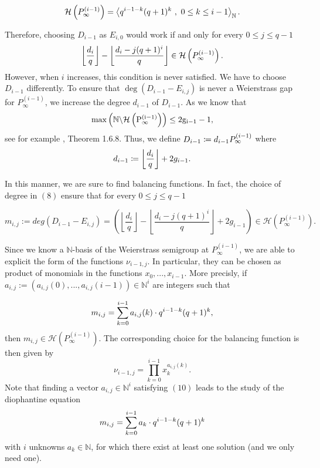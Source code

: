 \documentclass[10pt]{article}
\begin{document}
\[\mathcal{H}\left(P^{(i-1)}_{\infty}\right) = \left \langle q^{i-1-k}(q+1)^k \ , \ 0\leq k \leq i-1 \right\rangle_{\mathbb{N}}.\]

Therefore, choosing $D_{i-1}$ as $E_{i,0}$ would work if and only for every $0 \leq j \leq q-1$
\[ \left\lfloor \dfrac{d_i}{q} \right\rfloor - \left\lfloor \dfrac{d_i-j(q+1)^i}{q}\right\rfloor \in \mathcal{H}\left(P^{(i-1)}_{\infty}\right).\]
However, when $i$ increases, this condition is never satisfied. We have to choose $D_{i-1}$ differently.  To ensure that 
$\deg(D_{i-1}-E_{i,j})$ is never a Weierstrass gap for $P_{\infty}^{(i-1)}$, we increase the degree $d_{i-1}$ of $D_{i-1}$. As we know that
\[\rm{max}\left(\mathbb{N} \backslash \mathcal{H}\left(P^{(i-1)}_{\infty}\right)\right) \leq 2g_{i-1} -1,\]
see for example \cite{S08}, Theorem 1.6.8.
Thus, we define $D_{i-1}\coloneqq d_{i-1} P^{(i-1)}_{\infty}$ where
\begin{equation}\label{eq:deg_herm}
d_{i-1} \coloneqq \left\lfloor \dfrac{d_i}{q}\right\rfloor + 2g_{i-1}.
\end{equation}


In this manner, we are sure to find balancing functions. In fact, the choice of degree in $(8)$ ensure that for every $0 \leq j \leq q-1$ 

\begin{equation}
m_{i,j}:=deg(D_{i-1}-E_{i,j}) =  \left(\left\lfloor \dfrac{d_i}{q} \right\rfloor - \left\lfloor \dfrac{d_i-j(q+1)^i}{q}\right\rfloor + 2g_{i-1} \right) \in \mathcal{H}\left(P_{\infty}^{(i-1)}\right).
\end{equation}

Since we know a $\mathbb{N}$-basis of the Weierstrass semigroup at $P_{\infty}^{(i-1)}$, we are able to explicit the form of the functions $\nu_{i-1,j}$. In particular, they can be chosen as product of monomials in the functions $x_0,...,x_{i-1}$. More precisly, if $a_{i,j} := (a_{i,j}(0),...,a_{i,j}(i-1)) \in \mathbb{N}^i$ are integers such that

\begin{equation}
m_{i,j} = \sum\limits_{k=0}^{i-1} a_{i,j}(k) \cdot q^{i-1-k}(q+1)^k,
\end{equation}
then $m_{i,j} \in \mathcal{H}\left(P_{\infty}^{(i-1)}\right)$. The corresponding choice for the balancing function is then given by 
\[ \nu_{i-1,j} = \prod\limits_{k=0}^{i-1} x_k^{a_{i,j}(k)}.\]
Note that finding a vector $a_{i,j} \in \mathbb{N}^i$ satisfying $(10)$ leads to the study of the diophantine equation
\[m_{i,j} = \sum\limits_{k=0}^{i-1} a_k \cdot q^{i-1-k}(q+1)^k\]
with $i$ unknowns $a_k \in \mathbb{N}$, for which there exist at least one solution (and we only need one).
\end{document}
